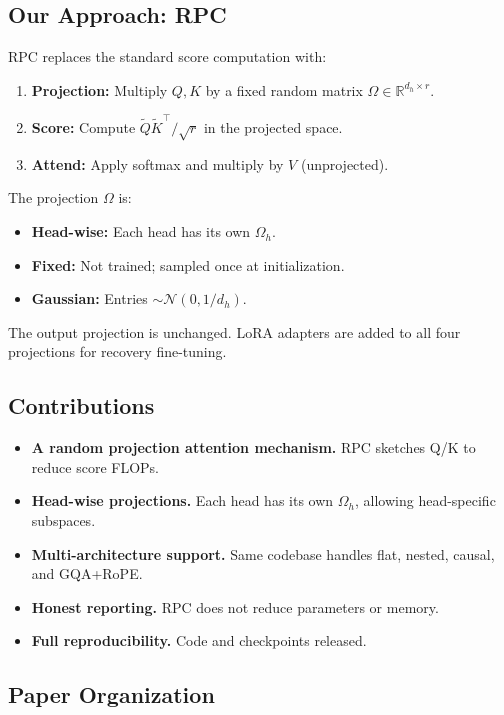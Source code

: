 \subsection{Our Approach: RPC}

RPC replaces the standard score computation with:

\begin{enumerate}
\item \textbf{Projection:} Multiply $Q, K$ by a fixed random matrix $\Omega \in \mathbb{R}^{d_h \times r}$.
\item \textbf{Score:} Compute $\tilde{Q} \tilde{K}^\top / \sqrt{r}$ in the projected space.
\item \textbf{Attend:} Apply softmax and multiply by $V$ (unprojected).

\end{enumerate}
The projection $\Omega$ is:
\begin{itemize}
\item \textbf{Head-wise:} Each head has its own $\Omega_h$.
\item \textbf{Fixed:} Not trained; sampled once at initialization.
\item \textbf{Gaussian:} Entries $\sim \mathcal{N}(0, 1/d_h)$.

\end{itemize}
The output projection is unchanged. LoRA adapters are added to all four 
projections for recovery fine-tuning.

\subsection{Contributions}

\begin{itemize}
\item \textbf{A random projection attention mechanism.} RPC sketches Q/K to reduce
  score FLOPs.
\item \textbf{Head-wise projections.} Each head has its own $\Omega_h$, allowing
  head-specific subspaces.
\item \textbf{Multi-architecture support.} Same codebase handles flat, nested,
  causal, and GQA+RoPE.
\item \textbf{Honest reporting.} RPC does not reduce parameters or memory.
\item \textbf{Full reproducibility.} Code and checkpoints released.

\end{itemize}
\subsection{Paper Organization}

